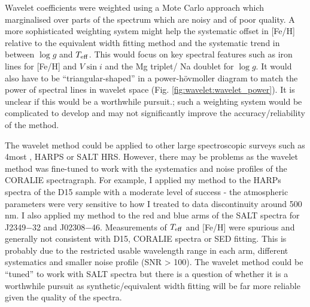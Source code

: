 Wavelet coefficients were weighted using a Mote Carlo approach which marginalised over parts of the spectrum which are noisy and of poor quality. A more sophisticated weighting system might help the systematic offset in [Fe/H] relative to the equivalent width fitting method and the systematic trend in between $\log g$ and $T_{\rm eff}$. This would focus on key spectral features such as iron lines for [Fe/H] and $V \sin i$ and the Mg triplet/ Na doublet for $\log g$.  It would also have to be ``triangular-shaped'' in a power-h\"{o}vmoller diagram to match the power of spectral lines in wavelet space (Fig. \ref{fig:wavelet:wavelet_power}). It is unclear if this would be a worthwhile pursuit.; such a weighting system would be complicated to develop and may not significantly improve the accuracy/reliability of the method. 


The wavelet method could be applied to other large spectroscopic surveys such as 4most \citep{2012SPIE.8446E..0TD}, HARPS or SALT HRS. However, there may be problems as the wavelet method was fine-tuned to work with the systematics and noise profiles of the CORALIE spectragraph. For example, I applied my method to the HARPs spectra of the D15 sample with a moderate level of success - the atmospheric parameters were very sensitive to how I treated to data discontinuity around 500\,nm. I also applied my method to the red and blue arms of the SALT spectra for J2349$-$32 and J02308$-$46. Measurements of $T_{\rm eff}$ and [Fe/H] were spurious and generally not consistent with D15, CORALIE spectra or SED fitting. This is probably due to the restricted usable wavelength range in each arm, different systematics and smaller noise profile (SNR > 100). The wavelet method could be ``tuned'' to work with SALT spectra but there is a question of whether it is a worthwhile pursuit as synthetic/equivalent width fitting will be far more reliable given the quality of the spectra. \\







